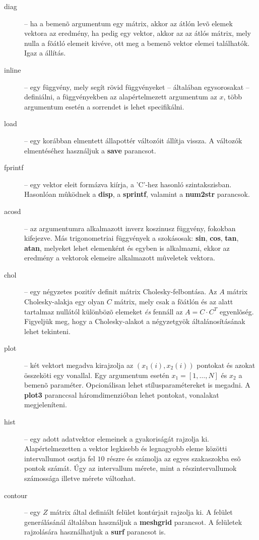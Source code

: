 {\begin{description}
    \item[diag] -- ha a bemenõ argumentum egy mátrix, akkor az átlón levõ elemek vektora az eredmény, ha pedig egy vektor, akkor az az átlós mátrix, mely nulla a fõátló elemeit kivéve, ott meg a bemenõ vektor elemei találhatók. Igaz a  állítás.
    \item[inline] -- egy függvény, mely segít rövid függvényeket -- általában egysorosakat -- definiálni, a függvényekben az alapértelmezett argumentum az $x$, több argumentum esetén a sorrendet is lehet specifikálni.
    \item[load] -- egy korábban elmentett állapottér változóit állítja vissza. A változók elmentéséhez használjuk a {\bf save} parancsot.
    \item[fprintf] -- egy vektor eleit formázva kiírja, a 'C'-hez hasonló szintakszisban. Hasonlóan mûködnek a {\bf disp}, a {\bf sprintf}, valamint a {\bf num2str} parancsok.
    \item[acosd] -- az argumentumra alkalmazott inverz koszinusz függvény, fokokban kifejezve. Más trigonometriai függvények a szokásosak: {\bf sin}, {\bf cos}, {\bf tan}, {\bf atan}, melyeket lehet elemenként és egyben is alkalmazni, ekkor az eredmény a vektorok elemeire alkalmazott mûveletek vektora.
    \item[chol] -- egy négyzetes pozitív definit mátrix Cholesky-felbontása. Az $A$ mátrix Cholesky-alakja egy olyan $C$ mátrix, mely csak a fõátlón és az alatt tartalmaz nullától különbözõ elemeket {\em és} fennáll az $A = C\cdot C^T$ egyenlõség. Figyeljük meg, hogy a Cholesky-alakot a négyzetgyök általánosításának lehet tekinteni.
    \item[plot] -- két vektort megadva kirajzolja az $(x_1(i),x_2(i))$ pontokat és azokat összeköti egy vonallal. Egy argumentum esetén $x_1=[1,\ldots,N]$ és $x_2$ a bemenõ paraméter. Opcionálisan lehet stílusparamétereket is megadni. A {\bf plot3} paranccsal háromdimenzióban lehet pontokat, vonalakat megjeleníteni.
    \item[hist] -- egy adott adatvektor elemeinek a gyakoriságát rajzolja ki. Alapértelmezetten a vektor legkisebb és legnagyobb eleme közötti intervallumot osztja fel $10$ részre és számolja az egyes szakaszokba esõ pontok számát. Úgy az intervallum mérete, mint a részintervallumok számossága illetve mérete változhat.
    \item[contour] -- egy $Z$ mátrix által definiált felület kontúrjait rajzolja ki. A felület generálásánál általában használjuk a {\bf meshgrid} parancsot. A felületek rajzolására használhatjuk a {\bf surf} parancsot is.

\end{description}}
